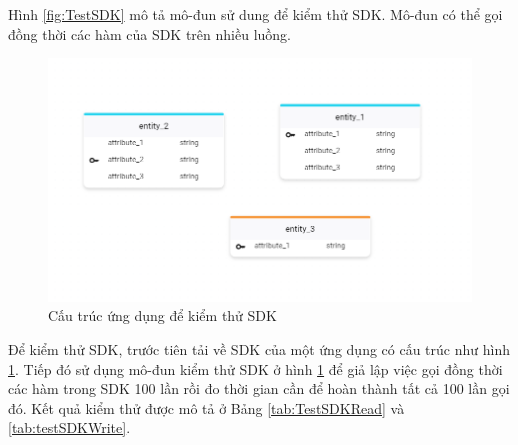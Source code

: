 \documentclass[../DoAn.tex]{subfiles}
\begin{document}
Hình \ref{fig:TestSDK} mô tả mô-đun sử dung để kiểm thử SDK. Mô-đun có thể gọi đồng thời các hàm của SDK trên nhiều luồng.

\begin{figure}[H]
    \centering
    \includegraphics[width=0.75\linewidth]{Hinhve/DoAn-TestSDKDapp.png}
    \caption{Cấu trúc ứng dụng để kiểm thử SDK}
    \label{fig:TestSDKDapp}
\end{figure}

Để kiểm thử SDK, trước tiên tải về SDK của một ứng dụng có cấu trúc như hình \ref{fig:TestSDKDapp}. Tiếp đó sử dụng mô-đun kiểm thử SDK ở hình \ref{fig:TestSDKDapp} để giả lập việc gọi đồng thời các hàm trong SDK 100 lần rồi đo thời gian cần để hoàn thành tất cả 100 lần gọi đó. Kết quả kiểm thử được mô tả ở Bảng \ref{tab:TestSDKRead} và \ref{tab:testSDKWrite}.
\end{document}
